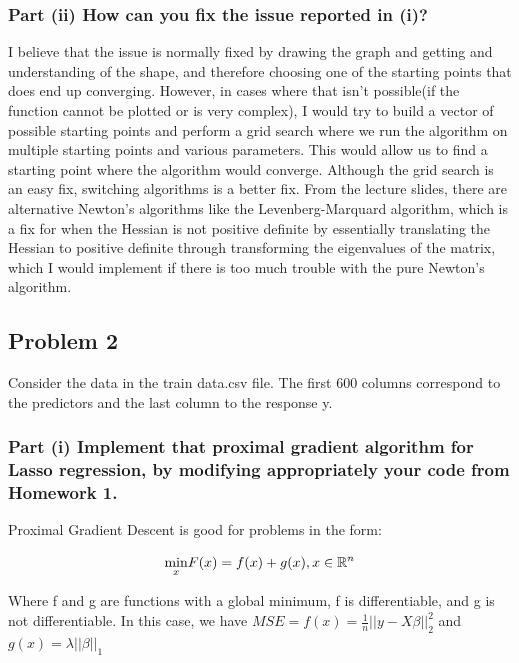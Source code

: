 \documentclass[
  letterpaper,
  DIV=11,
  numbers=noendperiod]{scrartcl}
\begin{document}
\subsubsection{Part (ii) How can you fix the issue reported in
(i)?}\label{part-ii-how-can-you-fix-the-issue-reported-in-i}

I believe that the issue is normally fixed by drawing the graph and
getting and understanding of the shape, and therefore choosing one of
the starting points that does end up converging. However, in cases where
that isn't possible(if the function cannot be plotted or is very
complex), I would try to build a vector of possible starting points and
perform a grid search where we run the algorithm on multiple starting
points and various parameters. This would allow us to find a starting
point where the algorithm would converge. Although the grid search is an
easy fix, switching algorithms is a better fix. From the lecture slides,
there are alternative Newton's algorithms like the Levenberg-Marquard
algorithm, which is a fix for when the Hessian is not positive definite
by essentially translating the Hessian to positive definite through
transforming the eigenvalues of the matrix, which I would implement if
there is too much trouble with the pure Newton's algorithm.

\newpage

\subsection{Problem 2}\label{problem-2}

Consider the data in the train data.csv file. The first 600 columns
correspond to the predictors and the last column to the response y.

\subsubsection{Part (i) Implement that proximal gradient algorithm for
Lasso regression, by modifying appropriately your code from Homework
1.}\label{part-i-implement-that-proximal-gradient-algorithm-for-lasso-regression-by-modifying-appropriately-your-code-from-homework-1.}

Proximal Gradient Descent is good for problems in the form:

\[
\underset{x}{\min} F(x) = f(x) + g(x), \space x \in \mathbb{R}^n
\]

Where f and g are functions with a global minimum, f is differentiable,
and g is not differentiable. In this case, we have
\(MSE=f(x)=\frac{1}{n}||y-X\beta||_2^2\) and \(g(x)=\lambda||\beta||_1\)
\end{document}

